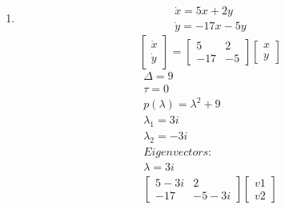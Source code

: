 \documentclass[a4paper,10pt]{article}
\begin{document}
\begin{enumerate}
\begin{enumerate}
            \item 
                \begin{equation}
                    \begin{aligned}
                        \dot{x}= 5x +2y\\
                        \dot{y}=-17x-5y
                    \end{aligned}
                \end{equation}
                \begin{equation}
                    \begin{bmatrix}
                        \dot{x}\\
                        \dot{y}    
                    \end{bmatrix}
                    =
                    \begin{bmatrix}
                        5 & 2\\
                        -17 &-5
                    \end{bmatrix}
                    \begin{bmatrix}
                        x\\
                        y
                    \end{bmatrix}
                \end{equation}
                \begin{equation}
                    \begin{aligned}
                        \Delta=9\\
                        \tau= 0\\
                        p(\lambda)=\lambda^{2} +9\\
                        \lambda_{1}= 3i\\
                        \lambda_{2}=-3i\\
                        Eigenvectors:\\
                        \lambda= 3i\\
                        \begin{bmatrix}
                            5-3i& 2\\
                            -17& -5-3i
                        \end{bmatrix}
                        \begin{bmatrix}
                            v1\\
                            v2
                        \end{bmatrix}

\end{aligned}
\end{equation}
\end{enumerate}
\end{enumerate}
\end{document}
